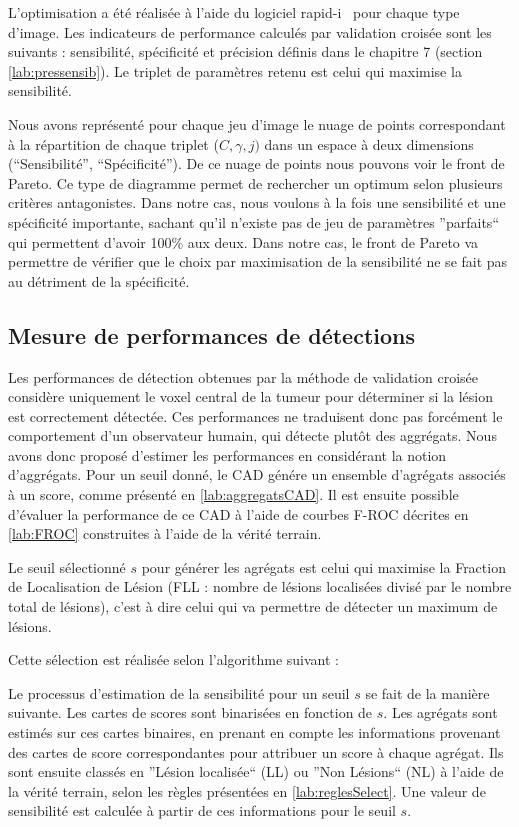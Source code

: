 L'optimisation a été réalisée à l'aide du logiciel rapid-i~\cite{mierswa2006} pour chaque type d'image. Les indicateurs de performance calculés par validation croisée sont les suivants : sensibilité, spécificité et précision définis dans le chapitre 7 (section \ref{lab:pressensib}). Le triplet de paramètres retenu est celui qui maximise la sensibilité.

Nous avons représenté pour chaque jeu d'image le nuage de points correspondant à la répartition de chaque triplet ($C, \gamma, j)$ dans un espace à deux dimensions (``Sensibilité'', ``Spécificité''). De ce nuage de points nous pouvons voir le front de Pareto. Ce type de diagramme permet de rechercher un optimum selon plusieurs critères antagonistes. Dans notre cas, nous voulons à la fois une sensibilité et une spécificité importante, sachant qu'il n'existe pas de jeu de paramètres ''parfaits`` qui permettent d'avoir 100\% aux deux. Dans notre cas, le front de Pareto va permettre de vérifier que le choix par maximisation de la sensibilité ne se fait pas au détriment de la spécificité.


\subsection{Mesure de performances de détections}
\label{lab:selectionSeuil}
\label{lab:optimIMSTNOMS}
Les performances de détection obtenues par la méthode de validation croisée considère uniquement le voxel central de la tumeur
pour déterminer si la lésion est correctement détectée. Ces performances ne traduisent donc pas forcément le comportement d'un observateur humain, qui détecte plutôt des aggrégats. Nous avons donc proposé d'estimer les performances en considérant la notion d'aggrégats. Pour un seuil donné, le CAD génére un ensemble d'agrégats associés à un score, comme présenté en \ref{lab:aggregatsCAD}. Il est ensuite possible d'évaluer la performance de ce CAD à l'aide de courbes F-ROC décrites en \ref{lab:FROC} construites à l'aide de la vérité terrain.

Le seuil sélectionné $s$ pour générer les agrégats est celui qui maximise la Fraction de Localisation de Lésion (FLL : nombre de lésions localisées divisé par le nombre total de lésions), c'est à dire celui qui va permettre de détecter un maximum de lésions. 

Cette sélection est réalisée selon l'algorithme suivant :

Le processus d'estimation de la sensibilité pour un seuil $s$ se fait de la manière suivante. Les cartes de scores sont binarisées en fonction de $s$. Les agrégats sont estimés sur ces cartes binaires, en prenant en compte les informations provenant des cartes de score correspondantes pour attribuer un score à chaque agrégat. Ils sont ensuite classés en ''Lésion localisée`` (LL) ou ''Non Lésions`` (NL) à l'aide de la vérité terrain, selon les règles présentées en \ref{lab:reglesSelect}. Une valeur de sensibilité est calculée à partir de ces informations pour le seuil $s$.

